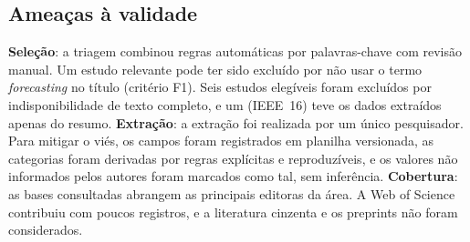 \subsection{Ameaças à validade}
\label{subsec:map-ameacas}

\textbf{Seleção}: a triagem combinou regras automáticas por palavras-chave com revisão manual. Um estudo relevante pode ter sido excluído por não usar o termo \textit{forecasting} no título (critério F1). Seis estudos elegíveis foram excluídos por indisponibilidade de texto completo, e um (IEEE~16) teve os dados extraídos apenas do resumo. \textbf{Extração}: a extração foi realizada por um único pesquisador. Para mitigar o viés, os campos foram registrados em planilha versionada, as categorias foram derivadas por regras explícitas e reproduzíveis, e os valores não informados pelos autores foram marcados como tal, sem inferência. \textbf{Cobertura}: as bases consultadas abrangem as principais editoras da área. A Web of Science contribuiu com poucos registros, e a literatura cinzenta e os preprints não foram considerados.
